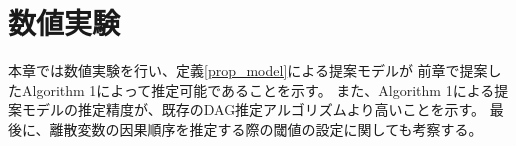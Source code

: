
\section{数値実験}
\label{part:experience}

本章では数値実験を行い、定義\ref{prop_model}による提案モデルが
前章で提案したAlgorithm 1によって推定可能であることを示す。
また、Algorithm 1による提案モデルの推定精度が、既存のDAG推定アルゴリズムより高いことを示す。
最後に、離散変数の因果順序を推定する際の閾値の設定に関しても考察する。
%

%

%

